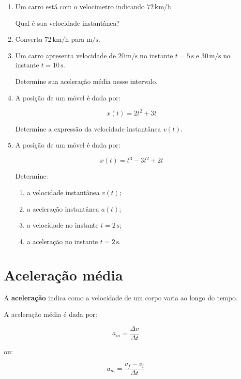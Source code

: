 \documentclass[a4paper,12pt]{article}
\begin{document}
\begin{enumerate}

\item Um carro está com o velocímetro indicando
$72\,\text{km/h}$.

Qual é sua velocidade instantânea?

\vspace{1.5cm}


\item Converta $72\,\text{km/h}$ para $\text{m/s}$.

\vspace{1.5cm}


\item Um carro apresenta velocidade de $20\,\text{m/s}$ no instante
$t=5\,\text{s}$ e $30\,\text{m/s}$ no instante $t=10\,\text{s}$.

Determine sua aceleração média nesse intervalo.

\vspace{1.5cm}


\item A posição de um móvel é dada por:

\[
x(t)=2t^2+3t
\]

Determine a expressão da velocidade instantânea $v(t)$.

\vspace{1.5cm}


\item A posição de um móvel é dada por:

\[
x(t)=t^3-3t^2+2t
\]

Determine:

\begin{enumerate}
    \item a velocidade instantânea $v(t)$;
    \item a aceleração instantânea $a(t)$;
    \item a velocidade no instante $t=2\,\text{s}$;
    \item a aceleração no instante $t=2\,\text{s}$.
\end{enumerate}

\end{enumerate}


\section{Aceleração média}

\begin{ideia}

A \textbf{aceleração} indica como a velocidade de um corpo
varia ao longo do tempo.

A aceleração média é dada por:

\[
\boxed{
a_m=
\frac{\Delta v}{\Delta t}
}
\]

ou:

\[
\boxed{
a_m=
\frac{v_f-v_i}{\Delta t}
}
\]

\end{ideia}
\end{document}
